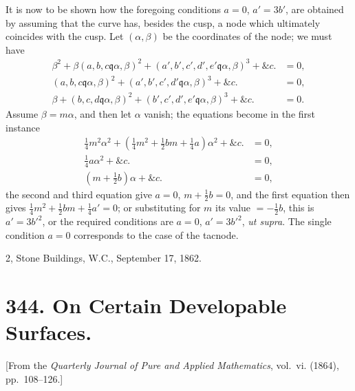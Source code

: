 \documentclass[11pt,a4paper]{article}
\theoremstyle{definition}
\begin{document}
It is now to be shown how the foregoing conditions $a = 0$, $a' = 3b'$, are obtained by
assuming that the curve has, besides the cusp, a node which ultimately coincides with
the cusp. Let $(\alpha, \beta)$ be the coordinates of the node; we must have
\begin{align*}
\beta^2 + \beta(a, b, c \mathbin{\mathfrak{q}} \alpha, \beta)^2 + (a', b', c', d', e' \mathbin{\mathfrak{q}} \alpha, \beta)^3 + \&c. &= 0, \\
(a, b, c \mathbin{\mathfrak{q}} \alpha, \beta)^2 + (a', b', c', d' \mathbin{\mathfrak{q}} \alpha, \beta)^3 + \&c. &= 0, \\
\beta + (b, c, d \mathbin{\mathfrak{q}} \alpha, \beta)^2 + (b', c', d', e' \mathbin{\mathfrak{q}} \alpha, \beta)^3 + \&c. &= 0.
\end{align*}
Assume $\beta = m\alpha$, and then let $\alpha$ vanish; the equations become in the first instance
\begin{align*}
\tfrac{1}{4}m^2\alpha^2 + (\tfrac{1}{4}m^2 + \tfrac{1}{2}bm + \tfrac{1}{4}a)\alpha^2 + \&c. &= 0, \\
\tfrac{1}{4}a\alpha^2 + \&c. &= 0, \\
(m + \tfrac{1}{2}b)\alpha + \&c. &= 0,
\end{align*}
the second and third equation give $a = 0$, $m + \tfrac{1}{2}b = 0$, and the first equation then gives
$\tfrac{1}{4}m^2 + \tfrac{1}{2}bm + \tfrac{1}{4}a' = 0$;
or substituting for $m$ its value $= -\tfrac{1}{2}b$, this is $a' = 3b'^2$, or the required conditions are
$a = 0$, $a' = 3b'^2$, \textit{ut supra}. The single condition $a = 0$ corresponds to the case of
the tacnode.

\begin{flushright}
2, Stone Buildings, W.C., September 17, 1862.
\end{flushright}

\newpage
\section{344. On Certain Developable Surfaces.}

[From the \textit{Quarterly Journal of Pure and Applied Mathematics}, vol.\ vi. (1864),
pp.~108--126.]
\end{document}
